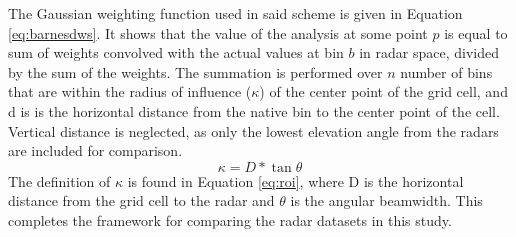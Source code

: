 The Gaussian weighting function used in said scheme is given in Equation \ref{eq:barnesdws}. It shows that the value of the analysis at some point $p$ is equal to sum of weights convolved with the actual values at bin $b$ in radar space, divided by the sum of the weights. The summation is performed over $n$ number of bins that are within the radius of influence ($\kappa$) of the center point of the grid cell, and d is is the horizontal distance from the native bin to the center point of the cell. Vertical distance is neglected, as only the lowest elevation angle from the radars are included for comparison.
\begin{equation}\label{eq:roi}
\kappa = D * \tan{\theta}
\end{equation}
The definition of $\kappa$ is found in Equation \ref{eq:roi}, where D is the horizontal distance from the grid cell to the radar and $\theta$ is the angular beamwidth. This completes the framework for comparing the radar datasets in this study.
